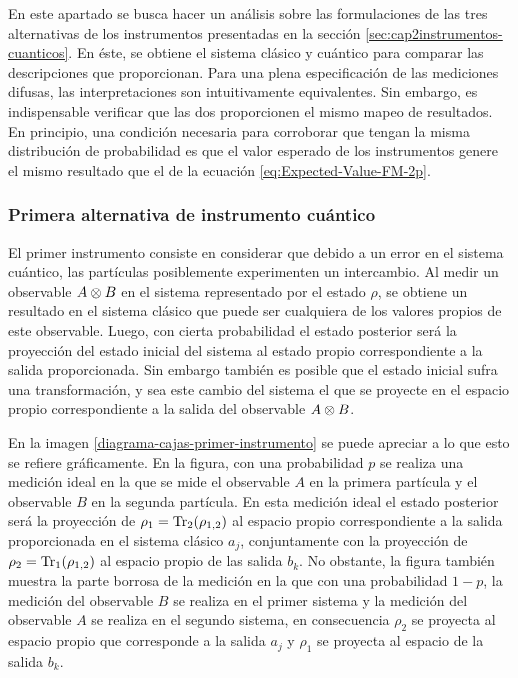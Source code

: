 En este apartado se busca hacer un análisis sobre las formulaciones de las tres alternativas de los instrumentos presentadas en la sección {\ref{sec:cap2instrumentos-cuanticos}}. En éste, se obtiene el sistema clásico y cuántico para comparar las descripciones que proporcionan. Para una plena especificación de las mediciones difusas, las interpretaciones son intuitivamente equivalentes. Sin embargo, es indispensable verificar que las dos proporcionen el mismo mapeo de resultados. En principio, una condición necesaria para corroborar que tengan la misma distribución de probabilidad es que el valor esperado de los instrumentos genere el mismo resultado que el de la ecuación {\eqref{eq:Expected-Value-FM-2p}}. 


\subsubsection{Primera alternativa de instrumento cuántico} %



El primer instrumento consiste en considerar que debido a un error en el
sistema cuántico, las partículas posiblemente experimenten un intercambio. Al
medir un observable ${A \otimes B}$ en el sistema representado por el estado $\rho$, se obtiene un resultado  en
el sistema clásico que puede ser cualquiera de los valores propios de este
observable. Luego, con cierta probabilidad el estado posterior será la
proyección del estado inicial del sistema al estado propio correspondiente a
la salida proporcionada. Sin embargo también es posible que el estado inicial
sufra una transformación, y sea este cambio del sistema el que se proyecte en
el espacio propio correspondiente a la salida del observable $A\otimes B$.


En la imagen {\ref{diagrama-cajas-primer-instrumento}} se puede apreciar a lo
que esto se refiere gráficamente.  En la figura, con una probabilidad $p$ se
realiza una medición ideal en la que se mide el observable $A$ en la primera
partícula y el observable $B$ en la segunda partícula. En esta medición ideal
el estado posterior será la proyección de $\rho_1={\rm Tr}_2(\rho_{1,2})$
al espacio propio
correspondiente a la salida proporcionada en el sistema clásico $a_j$,
conjuntamente con la proyección de $\rho_2={\rm Tr}_1(\rho_{1,2})$ al espacio propio de las
salida $b_k$. 
No obstante, la figura también muestra la parte borrosa de la medición en la que con una probabilidad $1-p$,
la medición del observable $B$ se realiza en el primer sistema y la medición
del observable $A$ se realiza en el segundo sistema, en consecuencia $\rho_2$ se proyecta al espacio propio que corresponde a la salida
$a_j$ y $\rho_1$ se proyecta al espacio de la salida $b_k$.


